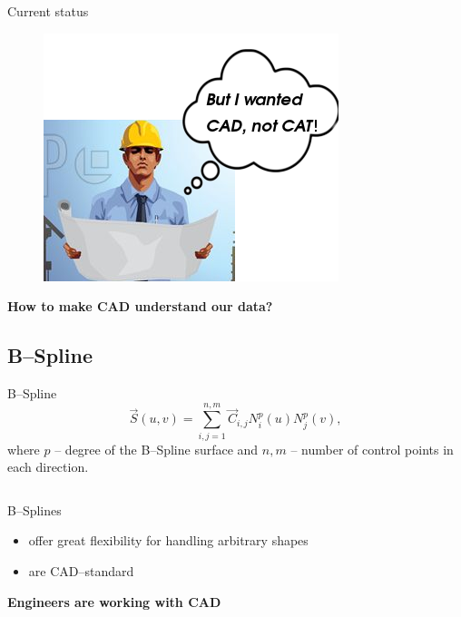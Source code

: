 \begin{frame}{Current status}
\begin{minipage}[t]{0.6\linewidth}
\begin{figure}
\includegraphics[width=0.9\linewidth]{Pictures/engineerThoughts2.png}
\end{figure}
\vspace{5mm}
\end{minipage}

\textbf{How to make CAD understand our data?}
\end{frame}

\subsection{B--Spline}
\begin{frame}{B--Spline}
\begin{equation*}
\vec{S}\left(u,v\right)=\sum\limits_{i,j=1}^{n,m} \vec{C}_{i,j} N_i^p\left(u\right) N_j^p\left(v\right),
\end{equation*}
where $p$ -- degree of the B--Spline surface and $n,m$ -- number of control points in each direction.
\begin{columns}
\begin{column}{.45\textwidth}
B--Splines
\begin{itemize}
\item offer great flexibility for handling arbitrary shapes
\item are CAD--standard
\end{itemize}
\textbf{Engineers are working with CAD}
\end{column}
\begin{column}{.45\textwidth}

\end{column}
\end{columns}
\end{frame}

